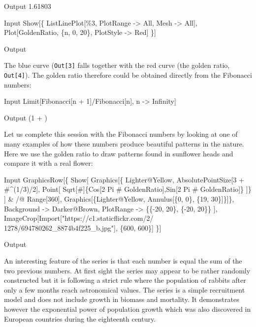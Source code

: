 \documentclass[11pt,fleqn]{book} %
\begin{document}
\begin{theorem}
\begin{mmaCell}{Output}
  1.61803 
\end{mmaCell}
\begin{mmaCell}{Input}
  Show[\{
    ListLinePlot[\%3, PlotRange -> All, Mesh -> All],
    Plot[GoldenRatio, \{n, 0, 20\}, PlotStyle -> Red]
  \}]
\end{mmaCell}
\begin{mmaCell}[moregraphics={moreig={scale=.8}}]{Output}
\end{mmaCell}
The blue curve (\texttt{Out[3]} falls together with the red curve (the golden ratio, \texttt{Out[4]}). The golden ratio therefore could be obtained directly from the Fibonacci numbers:
\begin{mmaCell}{Input}
  Limit[Fibonacci[n + 1]/Fibonacci[n], n -> Infinity]
\end{mmaCell}
\begin{mmaCell}{Output}
   \Big(1 + \Big) 
\end{mmaCell}
Let us complete this session with the Fibonacci numbers by looking at one of many examples of how these numbers produce beautiful patterns in the nature. Here we use the golden ratio to draw patterns found in sunflower heads and compare it with a real flower:
\begin{mmaCell}{Input}
  GraphicsRow[\{
    Show[
      Graphics[\{
        Lighter@Yellow, AbsolutePointSize[3 + #^(1/3)/2],
        Point[
          Sqrt[#]\{Cos[2 Pi # GoldenRatio],Sin[2 Pi # GoldenRatio]\}
        ]\}
      ] & /@ Range[360],
      Graphics[\{Lighter@Yellow, Annulus[\{0, 0\}, \{19, 30\}]\}]\},
      Background -> Darker@Brown,
      PlotRange -> \{\{-20, 20\}, \{-20, 20\}\} ], 
    ImageCrop[Import["https://c1.staticflickr.com/2/
      1278/694780262_8874b4f225_b.jpg"], \{600, 600\}]
  \}]
\end{mmaCell}
\begin{mmaCell}[moregraphics={moreig={scale=.7}}]{Output}
\end{mmaCell}
\label{code:fibonacci}
\end{theorem}
\hfill \break
An interesting feature of the series is that each number is equal the sum of the two previous numbers. At first sight the series may appear to be rather randomly constructed but it is following a strict rule where the population of rabbits after only a few months reach astronomical values. The series is a simple recruitment model and does not include growth in biomass and mortality. It demonstrates however the exponential power of population growth which was also discovered in European countries during the eighteenth century.
\end{document}
